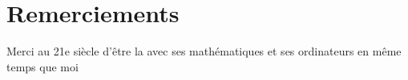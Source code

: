 \section*{Remerciements}

Merci au 21e siècle d'être la avec ses mathématiques et ses ordinateurs en même temps que moi
